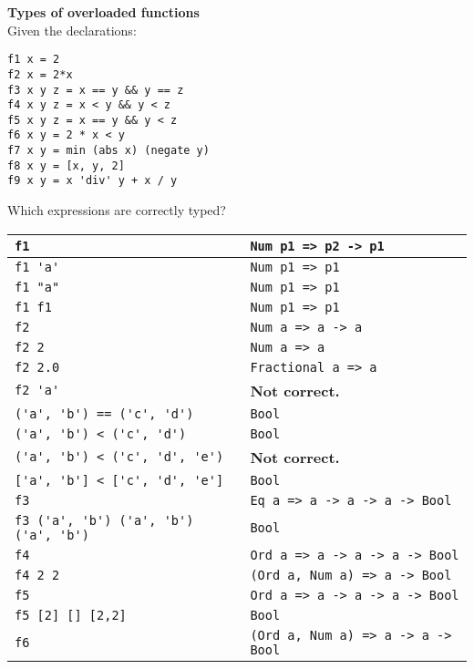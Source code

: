 \textbf{Types of overloaded functions}\\
Given the declarations:
\begin{lstlisting}
f1 x = 2
f2 x = 2*x
f3 x y z = x == y && y == z
f4 x y z = x < y && y < z
f5 x y z = x == y && y < z
f6 x y = 2 * x < y
f7 x y = min (abs x) (negate y)
f8 x y = [x, y, 2]
f9 x y = x 'div' y + x / y
\end{lstlisting}
Which expressions are correctly typed?\\
\begin{tabularx}{\linewidth}{|X|X|}
  \hline
  \lstinline|f1| & \lstinline|Num p1 => p2 -> p1|\\
  \hline
  \lstinline|f1 'a'| & \lstinline|Num p1 => p1|\\
  \hline
  \lstinline|f1 "a"| & \lstinline|Num p1 => p1|\\
  \hline
  \lstinline|f1 f1| & \lstinline|Num p1 => p1|\\
  \hline
  \lstinline|f2| & \lstinline|Num a => a -> a|\\
  \hline
  \lstinline|f2 2| & \lstinline|Num a => a|\\
  \hline
  \lstinline|f2 2.0| & \lstinline|Fractional a => a|\\
  \hline
  \lstinline|f2 'a'| & \textbf{Not correct.}\\
  \hline
  \lstinline|('a', 'b') == ('c', 'd')| & \lstinline|Bool|\\
  \hline
  \lstinline|('a', 'b') < ('c', 'd')| & \lstinline|Bool|\\
  \hline
  \lstinline|('a', 'b') < ('c', 'd', 'e')| & \textbf{Not correct.}\\
  \hline
  \lstinline|['a', 'b'] < ['c', 'd', 'e']| & \lstinline|Bool|\\
  \hline
  \lstinline|f3| & \lstinline|Eq a => a -> a -> a -> Bool|\\
  \hline
  \lstinline|f3 ('a', 'b') ('a', 'b') ('a', 'b')| & \lstinline|Bool|\\
  \hline
  \lstinline|f4| & \lstinline|Ord a => a -> a -> a -> Bool|\\
  \hline
  \lstinline|f4 2 2| & \lstinline|(Ord a, Num a) => a -> Bool|\\
  \hline
  \lstinline|f5| & \lstinline|Ord a => a -> a -> a -> Bool|\\
  \hline
  \lstinline|f5 [2] [] [2,2]| & \lstinline|Bool|\\
  \hline
  \lstinline|f6| & \lstinline|(Ord a, Num a) => a -> a -> Bool|\\
  \hline

\end{tabularx}
